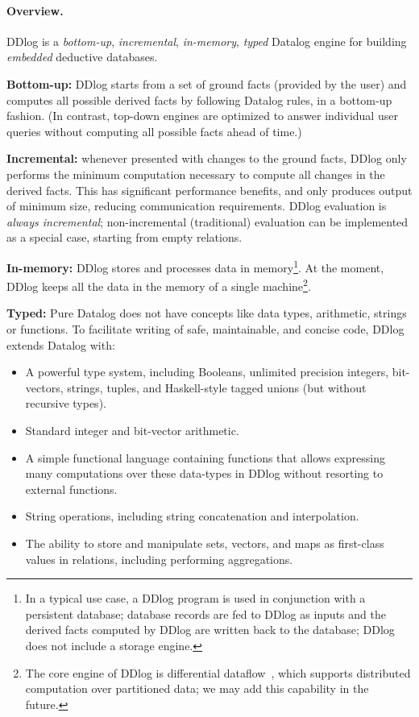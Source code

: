 \paragraph{Overview.}
DDlog is a \emph{bottom-up}, \emph{incremental}, \emph{in-memory},
\emph{typed} Datalog engine for building \emph{embedded} deductive
databases.

\textbf{Bottom-up:} DDlog starts from a set of ground facts (provided
by the user) and computes all possible derived facts by following
Datalog rules, in a bottom-up fashion.  (In contrast, top-down engines
are optimized to answer individual user queries without computing all
possible facts ahead of time.)

\textbf{Incremental:} whenever presented with changes to the ground
facts, DDlog only performs the minimum computation necessary to
compute all changes in the derived facts.  This has significant
performance benefits, and only produces output of minimum size,
reducing communication requirements.  DDlog evaluation is \emph{always
  incremental}; non-incremental (traditional) evaluation can be
implemented as a special case, starting from empty relations.

\textbf{In-memory:} DDlog stores and processes data in
memory\footnote{In a typical use case, a DDlog program is used in
  conjunction with a persistent database; database records are fed to
  DDlog as inputs and the derived facts computed by DDlog are written
  back to the database; DDlog does not include a storage engine.}.  At
the moment, DDlog keeps all the data in the memory of a single
machine\footnote{The core engine of DDlog is differential
  dataflow~\cite{differential-dataflow}, which supports distributed
  computation over partitioned data; we may add this capability in the
  future.}.

\textbf{Typed:} Pure Datalog does not have concepts like data types,
arithmetic, strings or functions.  To facilitate writing of safe,
maintainable, and concise code, DDlog extends Datalog with:
\begin{itemize}
\item A powerful type system, including Booleans, unlimited
  precision integers, bit-vectors, strings, tuples, and
  Haskell-style tagged unions (but without recursive types).

\item Standard integer and bit-vector arithmetic.

\item A simple functional language containing functions that allows
  expressing many computations over these data-types in DDlog without
  resorting to external functions.

\item String operations, including string concatenation and
  interpolation.

\item The ability to store and manipulate sets, vectors, and maps as
  first-class values in relations, including performing aggregations.
\end{itemize}

